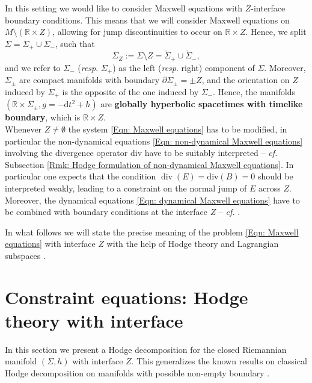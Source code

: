 In this setting we would like to consider Maxwell equations with $Z$-interface boundary conditions. This means that we will consider Maxwell equations on $M\setminus(\mathbb{R}\times Z)$, allowing for jump discontinuities to occur on $\mathbb{R}\times Z$.
Hence, we split $\Sigma=\Sigma_+\cup\Sigma_-$, such that
\begin{equation}\label{Eqn: Sigma Z splitting}
	 \Sigma_Z:=\Sigma\setminus Z=\mathring{\Sigma}_+\cup\mathring{\Sigma}_-,
\end{equation} and we refer to $\Sigma_-$ (\textit{resp}. $\Sigma_+$) as the left (\textit{resp}. right) component of $\Sigma$.
Moreover, $\Sigma_\pm$ are compact manifolds with boundary $\partial \Sigma_\pm=\pm Z$, and the orientation on $Z$ induced by $\Sigma_+$ is the opposite of the one induced by $\Sigma_-$.
Hence, the manifolds $(\mathbb{R}\times\Sigma_\pm,g=-\mathrm{d}t^2+h)$ are \textbf{globally hyperbolic spacetimes with timelike boundary}, which is $\mathbb{R}\times Z$.\\

Whenever $Z\neq\emptyset$ the system \eqref{Eqn: Maxwell equations} has to be modified, in particular the non-dynamical equations \eqref{Eqn: non-dynamical Maxwell equations} involving the divergence operator $\mathrm{div}$ have to be suitably interpreted -- \textit{cf.} Subsection \ref{Rmk: Hodge formulation of non-dynamical Maxwell equations}.
In particular one expects that the condition $\operatorname{div}(E)=\mathrm{div}(B)=0$ should be interpreted weakly, leading to a constraint on the normal jump of $E$ across $Z$.
Moreover, the dynamical equations \eqref{Eqn: dynamical Maxwell equations} have to be combined with boundary conditions at the interface $Z$ -- \textit{cf.} \cite[Sec. I.5]{Jackson-99}.

In what follows we will state the precise meaning of the problem \eqref{Eqn: Maxwell equations} with interface $Z$ with the help of Hodge theory and Lagrangian subspaces \cite{Everitt-Markus-99,Everitt-Markus-03,Everitt-Markus-05}.


\section{Constraint equations: Hodge theory with interface}\label{Sec: Non-dynamical equations: Hodge theory with interface}
In this section we present a Hodge decomposition for the closed Riemannian manifold $(\Sigma,h)$ with interface $Z$.
This generalizes the known results on classical Hodge decomposition on manifolds with possible non-empty boundary \cite{Amar-17,Axelsson-McIntosh-04,Gaffney-55,Gromov-91,Kodaira-49,Li-09,Schwarz-95,Scott-95,Zulfikar-Stroock-00}.\\

